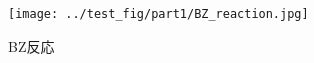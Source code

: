 \documentclass[autodetect-engine,dvipdfmx-if-dvi,a4paper,ja=standard]{bxjsarticle}
\begin{document}
\lipsum[1]

\begin{figure}[htb]
  \centering
  \texttt{[image: ../test\_fig/part1/BZ\_reaction.jpg]}
  \caption{BZ反応}
  \label{fig:test}
\end{figure}
%   
%   
\end{document}
